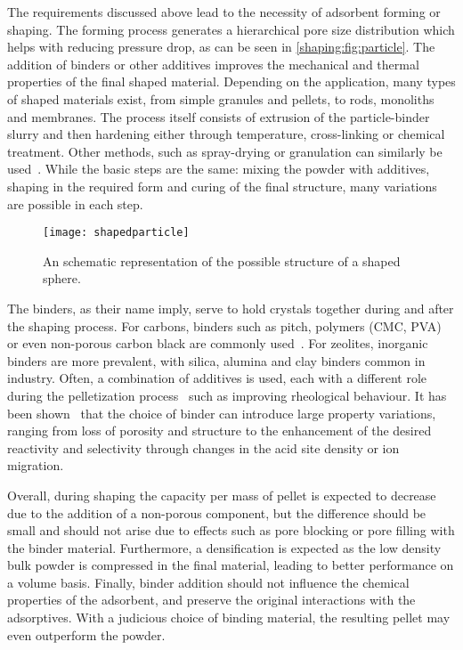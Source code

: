 The requirements discussed above lead to the necessity of adsorbent
forming or shaping. The forming process generates a hierarchical pore size 
distribution which helps with reducing pressure drop, as can be
seen in \autoref{shaping:fig:particle}. The addition of 
binders or other additives improves the mechanical and thermal
properties of the final shaped material. Depending on the application,
many types of shaped materials exist, from simple granules and 
pellets, to rods, monoliths and membranes.
The process itself consists of extrusion of the particle-binder slurry 
and then hardening either through temperature, cross-linking
or chemical treatment. Other methods, such as spray-drying or 
granulation can similarly be 
used~\cite{ruthvenPrinciplesAdsorptionAdsorption1984}.
While the basic steps are the same: mixing the powder with
additives, shaping in the required form and curing of the final
structure, many variations are possible in each step.

\begin{figure}[!htb]
	\centering
	\texttt{[image: shapedparticle]}
	\caption{An schematic representation of the possible structure
	of a shaped sphere.}%
	\label{shaping:fig:particle}
\end{figure}

The binders, as their name imply, serve to hold crystals together
during and after the shaping process.
For carbons, binders such as pitch, polymers (CMC, \gls{PVA}) or 
even non-porous carbon black are 
commonly used~\cite{ohjiAdvancedProcessingManufacturing2008}.
For zeolites, inorganic binders are more prevalent, with silica, 
alumina and clay binders common in industry. 
Often, a combination of additives is used, each with a different role 
during the pelletization process~\cite{bandoszActivatedCarbonSurfaces2006}
such as improving rheological behaviour. It has been 
shown~\cite{whitingcuriouscasezeolite2016, MichelsEffectsBindersPerformance2014}
that the choice of binder can introduce large property variations, ranging 
from loss of porosity and structure to the enhancement of the desired
reactivity and selectivity through changes in the acid site density 
or ion migration.

Overall, during shaping the capacity per mass of pellet is expected to 
decrease due to the addition of a non-porous component, but the
difference should be small and should not arise due to effects 
such as pore blocking or pore filling with the binder material.
Furthermore, a densification is expected as the low density bulk powder
is compressed in the final material, leading to
better performance on a volume basis.
Finally, binder addition should not influence the chemical properties 
of the adsorbent, and preserve the original interactions with the adsorptives.
With a judicious choice of binding material, the resulting pellet
may even outperform the powder.

